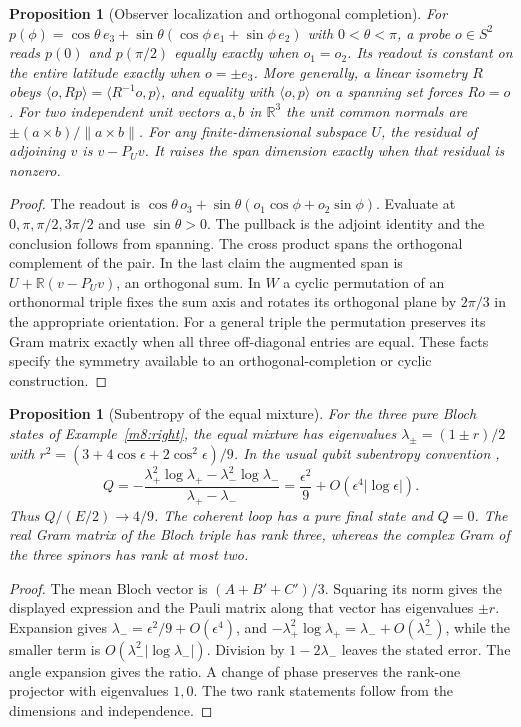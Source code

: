 \documentclass[11pt,reqno]{amsart}
\newtheorem{proposition}[theorem]{Proposition}
\theoremstyle{definition}
\theoremstyle{remark}
\numberwithin{equation}{section}
\begin{document}
\begin{proposition}[Observer localization and orthogonal completion]\label{m8:observers}
For $p(\phi)=\cos\theta\,e_3+\sin\theta(\cos\phi\,e_1+\sin\phi\,e_2)$
with $0<\theta<\pi$, a probe $o\in S^2$ reads $p(0)$ and $p(\pi/2)$
equally exactly when $o_1=o_2$. Its readout is constant on the entire
latitude exactly when $o=\pm e_3$. More generally, a linear isometry
$R$ obeys $\langle o,Rp\rangle=\langle R^{-1}o,p\rangle$, and equality
with $\langle o,p\rangle$ on a spanning set forces $Ro=o$.
For two independent unit vectors $a,b$ in $\mathbb R^3$ the unit common
normals are $\pm(a\times b)/\|a\times b\|$. For any finite-dimensional
subspace $U$, the residual of adjoining $v$ is $v-P_Uv$. It raises
the span dimension exactly when that residual is nonzero.
\end{proposition}
\begin{proof}
The readout is $\cos\theta\,o_3+\sin\theta(o_1\cos\phi+o_2\sin\phi)$.
Evaluate at $0,\pi,\pi/2,3\pi/2$ and use $\sin\theta>0$. The pullback
is the adjoint identity and the conclusion follows from spanning.
The cross product spans the orthogonal complement of the pair. In
the last claim the augmented span is $U+\mathbb R(v-P_Uv)$, an
orthogonal sum. In $W$ a cyclic permutation of an orthonormal triple
fixes the sum axis and rotates its orthogonal plane by $2\pi/3$ in the
appropriate orientation. For a general triple the permutation
preserves its Gram matrix exactly when all three off-diagonal entries
are equal. These facts specify the symmetry available to an
orthogonal-completion or cyclic construction.
\end{proof}

\begin{proposition}[Subentropy of the equal mixture]\label{m8:subentropy}
For the three pure Bloch states of Example~\ref{m8:right}, the equal
mixture has eigenvalues $\lambda_\pm=(1\pm r)/2$ with
$r^2=(3+4\cos\epsilon+2\cos^2\epsilon)/9$. In the usual qubit
subentropy convention \cite{m8:subentropy-ref},
\[
 Q=-\frac{\lambda_+^2\log\lambda_+-\lambda_-^2\log\lambda_-}
           {\lambda_+-\lambda_-}
   =\frac{\epsilon^2}{9}+O(\epsilon^4|\log\epsilon|).
\]
Thus $Q/(E/2)\to4/9$. The coherent loop has a pure final state and
$Q=0$. The real Gram matrix of the Bloch triple has rank three,
whereas the complex Gram of the three spinors has rank at most two.
\end{proposition}
\begin{proof}
The mean Bloch vector is $(A+B'+C')/3$. Squaring its norm gives
the displayed expression and the Pauli matrix along that vector has
eigenvalues $\pm r$. Expansion gives $\lambda_-=\epsilon^2/9+
O(\epsilon^4)$, and $-\lambda_+^2\log\lambda_+=\lambda_-+
O(\lambda_-^2)$, while the smaller term is
$O(\lambda_-^2|\log\lambda_-|)$. Division by $1-2\lambda_-$ leaves
the stated error. The angle expansion gives the ratio. A change of
phase preserves the rank-one projector with eigenvalues $1,0$.
The two rank statements follow from the dimensions and independence.
\end{proof}
\end{document}
